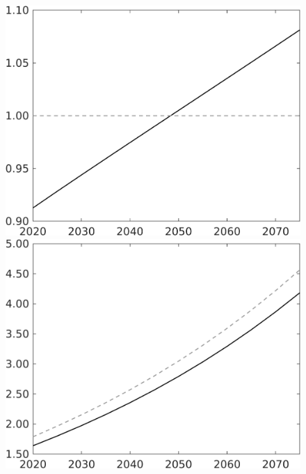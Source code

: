 \documentclass[12pt]{article}
\begin{document}
\begin{figure}[h!!]
\begin{minipage}[]{0.32\textwidth}
	\end{minipage}	
	\begin{minipage}[]{0.32\textwidth}
		\includegraphics[width=1\textwidth]{../../codding_model/own_basedOnFried/optimalPol_010922_revision/figures/all_13Sept22/CompTaul_Equlab_LFBAU_Reg0_lambdaa_spillover0_nsk0_xgr0_knspil0_sep1_countec0_GovRev0_etaa0.79_lgd0.png}
	\end{minipage}	
	\begin{minipage}[]{0.32\textwidth}
		\includegraphics[width=1\textwidth]{../../codding_model/own_basedOnFried/optimalPol_010922_revision/figures/all_13Sept22/CompTaul_Equlab_LFBAU_Reg0_Y_spillover0_nsk0_xgr0_knspil0_sep1_countec0_GovRev0_etaa0.79_lgd0.png}

\end{minipage}
\end{figure}
\end{document}
